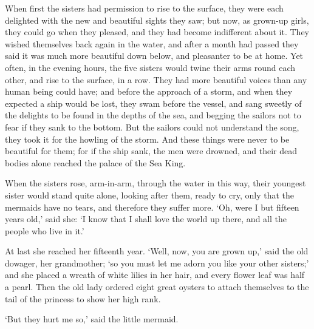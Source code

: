 When first the sisters had permission to rise to the surface, they were each delighted with the new and beautiful sights they saw; but now, as grown-up girls, they could go when they pleased, and they had become indifferent about it.
They wished themselves back again in the water, and after a month had passed they said it was much more beautiful down below, and pleasanter to be at home.
Yet often, in the evening hours, the five sisters would twine their arms round each other, and rise to the surface, in a row.
They had more beautiful voices than any human being could have; and before the approach of a storm, and when they expected a ship would be lost, they swam before the vessel, and sang sweetly of the delights to be found in the depths of the sea, and begging the sailors not to fear if they sank to the bottom.
But the sailors could not understand the song, they took it for the howling of the storm.
And these things were never to be beautiful for them; for if the ship sank, the men were drowned, and their dead bodies alone reached the palace of the Sea King.

When the sisters rose, arm-in-arm, through the water in this way, their youngest sister would stand quite alone, looking after them, ready to cry, only that the mermaids have no tears, and therefore they suffer more.
`Oh, were I but fifteen years old,' said she: `I know that I shall love the world up there, and all the people who live in it.'

At last she reached her fifteenth year.
`Well, now, you are grown up,' said the old dowager, her grandmother; `so you must let me adorn you like your other sisters;' and she placed a wreath of white lilies in her hair, and every flower leaf was half a pearl.
Then the old lady ordered eight great oysters to attach themselves to the tail of the princess to show her high rank.

`But they hurt me so,' said the little mermaid.


